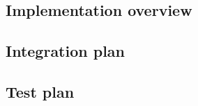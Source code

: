 \subsection{Implementation overview}
\label{sec:implementation_plan}



\subsection{Integration plan}
\label{sec:integration_plan}



\subsection{Test plan}
\label{sec:test_plan}


